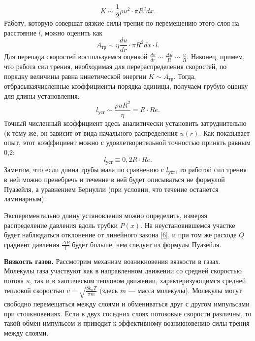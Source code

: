 \documentclass[a4paper, 12pt]{article}
\begin{document}
\begin{equation}\label{12}
K \sim \frac{1}{2}\rho u^2 \cdot \pi R^2dx.
\end{equation}
Работу, которую совершат вязкие силы трения по перемещению этого слоя на
расстояние $l$, можно оценить как
\begin{equation}\label{13}
A_{\text{тр}} \sim \eta\frac{du}{dr} \cdot \pi R^2dx \cdot l.
\end{equation}
Для перепада скоростей воспользуемся оценкой $\frac{du}{dr} \sim \frac{\Delta{u}}{R} \sim \frac{u}{R}$. Наконец, примем, что работа сил трения, необходимая для перераспределения скоростей,
по порядку величины равна кинетической энергии $K \sim A_{\text{тр}}$. Тогда, отбрасываячисленные коэффициенты порядка единицы, получаем грубую оценку для
длины установления:
\begin{equation}\label{14}
l_{\text{уст}} \sim \frac{\rho u R^2}{\eta} = R \cdot Re.
\end{equation}
Точный численный коэффициент здесь аналитически установить затруднительно (к тому же, он зависит от вида начального распределения $u(r)$. Как
показывает опыт, этот коэффициент можно с удовлетворительной точностью
принять равным 0,2:
\begin{equation}\label{15}
l_{\text{уст}} \equiv 0,2R \cdot Re.
\end{equation}
Заметим, что если длина трубы мала по сравнению с $l_{\text{уст}}$, то работой сил трения в ней можно пренебречь и течение в ней будет описываться не формулой
Пуазейля, а уравнением Бернулли (при условии, что течение останется ламинарным).
\par Экспериментально длину установления можно определить, измеряя распределение давления вдоль трубки $P(x)$. На неустановившемся участке будет
наблюдаться отклонение от линейного закона \eqref{6}, и при том же расходе $Q$ градиент давления $ \frac{\Delta{P}}{l} $ будет больше, чем следует из формулы Пуазейля.
\par {\bf Вязкость газов.} Рассмотрим механизм возникновения вязкости в газах.
Молекулы газа участвуют как в направленном движении со средней скоростью потока $u$, так и в хаотическом тепловом движении, характеризующимся средней тепловой скоростью $ \overline{v} = \sqrt{\frac{8k_{\text{Б}}T}{\pi m}}$ (здесь $m$ — масса молекулы). Молекулы могут свободно перемещаться между слоями и обмениваться друг с другом импульсами при столкновениях. Если в двух соседних слоях потоковые
скорости различны, то такой обмен импульсом и приводит к эффективному
возникновению силы трения между слоями.
\end{document}
